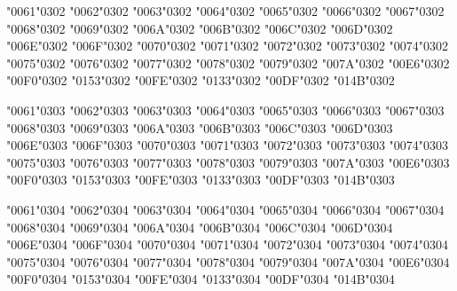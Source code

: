 \textsc{\char"0061\char"0302} \textsc{\char"0062\char"0302} \textsc{\char"0063\char"0302} \textsc{\char"0064\char"0302} \textsc{\char"0065\char"0302} \textsc{\char"0066\char"0302} \textsc{\char"0067\char"0302} \textsc{\char"0068\char"0302} \textsc{\char"0069\char"0302} \textsc{\char"006A\char"0302} \textsc{\char"006B\char"0302} \textsc{\char"006C\char"0302} \textsc{\char"006D\char"0302} \textsc{\char"006E\char"0302} \textsc{\char"006F\char"0302} \textsc{\char"0070\char"0302} \textsc{\char"0071\char"0302} \textsc{\char"0072\char"0302} \textsc{\char"0073\char"0302} \textsc{\char"0074\char"0302} \textsc{\char"0075\char"0302} \textsc{\char"0076\char"0302} \textsc{\char"0077\char"0302} \textsc{\char"0078\char"0302} \textsc{\char"0079\char"0302} \textsc{\char"007A\char"0302} \textsc{\char"00E6\char"0302} \textsc{\char"00F0\char"0302} \textsc{\char"0153\char"0302} \textsc{\char"00FE\char"0302} \textsc{\char"0133\char"0302} \textsc{\char"00DF\char"0302} \textsc{\char"014B\char"0302}

\textsc{\char"0061\char"0303} \textsc{\char"0062\char"0303} \textsc{\char"0063\char"0303} \textsc{\char"0064\char"0303} \textsc{\char"0065\char"0303} \textsc{\char"0066\char"0303} \textsc{\char"0067\char"0303} \textsc{\char"0068\char"0303} \textsc{\char"0069\char"0303} \textsc{\char"006A\char"0303} \textsc{\char"006B\char"0303} \textsc{\char"006C\char"0303} \textsc{\char"006D\char"0303} \textsc{\char"006E\char"0303} \textsc{\char"006F\char"0303} \textsc{\char"0070\char"0303} \textsc{\char"0071\char"0303} \textsc{\char"0072\char"0303} \textsc{\char"0073\char"0303} \textsc{\char"0074\char"0303} \textsc{\char"0075\char"0303} \textsc{\char"0076\char"0303} \textsc{\char"0077\char"0303} \textsc{\char"0078\char"0303} \textsc{\char"0079\char"0303} \textsc{\char"007A\char"0303} \textsc{\char"00E6\char"0303} \textsc{\char"00F0\char"0303} \textsc{\char"0153\char"0303} \textsc{\char"00FE\char"0303} \textsc{\char"0133\char"0303} \textsc{\char"00DF\char"0303} \textsc{\char"014B\char"0303}

\textsc{\char"0061\char"0304} \textsc{\char"0062\char"0304} \textsc{\char"0063\char"0304} \textsc{\char"0064\char"0304} \textsc{\char"0065\char"0304} \textsc{\char"0066\char"0304} \textsc{\char"0067\char"0304} \textsc{\char"0068\char"0304} \textsc{\char"0069\char"0304} \textsc{\char"006A\char"0304} \textsc{\char"006B\char"0304} \textsc{\char"006C\char"0304} \textsc{\char"006D\char"0304} \textsc{\char"006E\char"0304} \textsc{\char"006F\char"0304} \textsc{\char"0070\char"0304} \textsc{\char"0071\char"0304} \textsc{\char"0072\char"0304} \textsc{\char"0073\char"0304} \textsc{\char"0074\char"0304} \textsc{\char"0075\char"0304} \textsc{\char"0076\char"0304} \textsc{\char"0077\char"0304} \textsc{\char"0078\char"0304} \textsc{\char"0079\char"0304} \textsc{\char"007A\char"0304} \textsc{\char"00E6\char"0304} \textsc{\char"00F0\char"0304} \textsc{\char"0153\char"0304} \textsc{\char"00FE\char"0304} \textsc{\char"0133\char"0304} \textsc{\char"00DF\char"0304} \textsc{\char"014B\char"0304}

